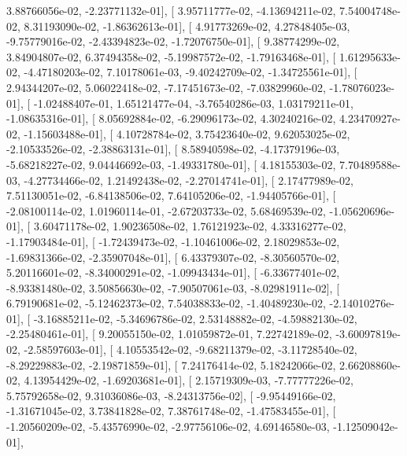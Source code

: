 \documentclass{article}
\begin{document}
          3.88766056e-02,  -2.23771132e-01],
       [  3.95711777e-02,  -4.13694211e-02,   7.54004748e-02,
          8.31193090e-02,  -1.86362613e-01],
       [  4.91773269e-02,   4.27848405e-03,  -9.75779016e-02,
         -2.43394823e-02,  -1.72076750e-01],
       [  9.38774299e-02,   3.84904807e-02,   6.37494358e-02,
         -5.19987572e-02,  -1.79163468e-01],
       [  1.61295633e-02,  -4.47180203e-02,   7.10178061e-03,
         -9.40242709e-02,  -1.34725561e-01],
       [  2.94344207e-02,   5.06022418e-02,  -7.17451673e-02,
         -7.03829960e-02,  -1.78076023e-01],
       [ -1.02488407e-01,   1.65121477e-04,  -3.76540286e-03,
          1.03179211e-01,  -1.08635316e-01],
       [  8.05692884e-02,  -6.29096173e-02,   4.30240216e-02,
          4.23470927e-02,  -1.15603488e-01],
       [  4.10728784e-02,   3.75423640e-02,   9.62053025e-02,
         -2.10533526e-02,  -2.38863131e-01],
       [  8.58940598e-02,  -4.17379196e-03,  -5.68218227e-02,
          9.04446692e-03,  -1.49331780e-01],
       [  4.18155303e-02,   7.70489588e-03,  -4.27734466e-02,
          1.21492438e-02,  -2.27014741e-01],
       [  2.17477989e-02,   7.51130051e-02,  -6.84138506e-02,
          7.64105206e-02,  -1.94405766e-01],
       [ -2.08100114e-02,   1.01960114e-01,  -2.67203733e-02,
          5.68469539e-02,  -1.05620696e-01],
       [  3.60471178e-02,   1.90236508e-02,   1.76121923e-02,
          4.33316277e-02,  -1.17903484e-01],
       [ -1.72439473e-02,  -1.10461006e-02,   2.18029853e-02,
         -1.69831366e-02,  -2.35907048e-01],
       [  6.43379307e-02,  -8.30560570e-02,   5.20116601e-02,
         -8.34000291e-02,  -1.09943434e-01],
       [ -6.33677401e-02,  -8.93381480e-02,   3.50856630e-02,
         -7.90507061e-03,  -8.02981911e-02],
       [  6.79190681e-02,  -5.12462373e-02,   7.54038833e-02,
         -1.40489230e-02,  -2.14010276e-01],
       [ -3.16885211e-02,  -5.34696786e-02,   2.53148882e-02,
         -4.59882130e-02,  -2.25480461e-01],
       [  9.20055150e-02,   1.01059872e-01,   7.22742189e-02,
         -3.60097819e-02,  -2.58597603e-01],
       [  4.10553542e-02,  -9.68211379e-02,  -3.11728540e-02,
         -8.29229883e-02,  -2.19871859e-01],
       [  7.24176414e-02,   5.18242066e-02,   2.66208860e-02,
          4.13954429e-02,  -1.69203681e-01],
       [  2.15719309e-03,  -7.77777226e-02,   5.75792658e-02,
          9.31036086e-03,  -8.24313756e-02],
       [ -9.95449166e-02,  -1.31671045e-02,   3.73841828e-02,
          7.38761748e-02,  -1.47583455e-01],
       [ -1.20560209e-02,  -5.43576990e-02,  -2.97756106e-02,
          4.69146580e-03,  -1.12509042e-01],
\end{document}
